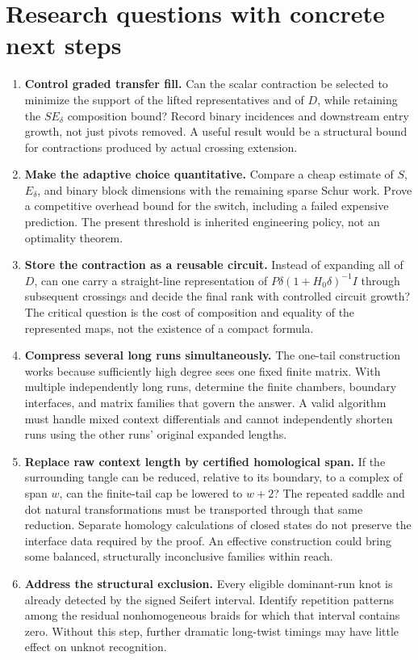 \documentclass[11pt]{article}
\theoremstyle{definition}
\theoremstyle{remark}
\begin{document}
\section{Research questions with concrete next steps}
\label{sec:future}
\begin{enumerate}[label=\textbf{\arabic*.},itemsep=6pt]
\item \textbf{Control graded transfer fill.} Can the scalar contraction be selected to minimize the support of the lifted representatives and of $D$, while retaining the $S E_\delta$ composition bound? Record binary incidences and downstream entry growth, not just pivots removed. A useful result would be a structural bound for contractions produced by actual crossing extension.
\item \textbf{Make the adaptive choice quantitative.} Compare a cheap estimate of $S$, $E_\delta$, and binary block dimensions with the remaining sparse Schur work. Prove a competitive overhead bound for the switch, including a failed expensive prediction. The present threshold is inherited engineering policy, not an optimality theorem.
\item \textbf{Store the contraction as a reusable circuit.} Instead of expanding all of $D$, can one carry a straight-line representation of $P\delta(1+H_0\delta)^{-1}I$ through subsequent crossings and decide the final rank with controlled circuit growth? The critical question is the cost of composition and equality of the represented maps, not the existence of a compact formula.
\item \textbf{Compress several long runs simultaneously.} The one-tail construction works because sufficiently high degree sees one fixed finite matrix. With multiple independently long runs, determine the finite chambers, boundary interfaces, and matrix families that govern the answer. A valid algorithm must handle mixed context differentials and cannot independently shorten runs using the other runs' original expanded lengths.
\item \textbf{Replace raw context length by certified homological span.} If the surrounding tangle can be reduced, relative to its boundary, to a complex of span $w$, can the finite-tail cap be lowered to $w+2$? The repeated saddle and dot natural transformations must be transported through that same reduction. Separate homology calculations of closed states do not preserve the interface data required by the proof. An effective construction could bring some balanced, structurally inconclusive families within reach.
\item \textbf{Address the structural exclusion.} Every eligible dominant-run knot is already detected by the signed Seifert interval. Identify repetition patterns among the residual nonhomogeneous braids for which that interval contains zero. Without this step, further dramatic long-twist timings may have little effect on unknot recognition.

\end{enumerate}
\end{document}

